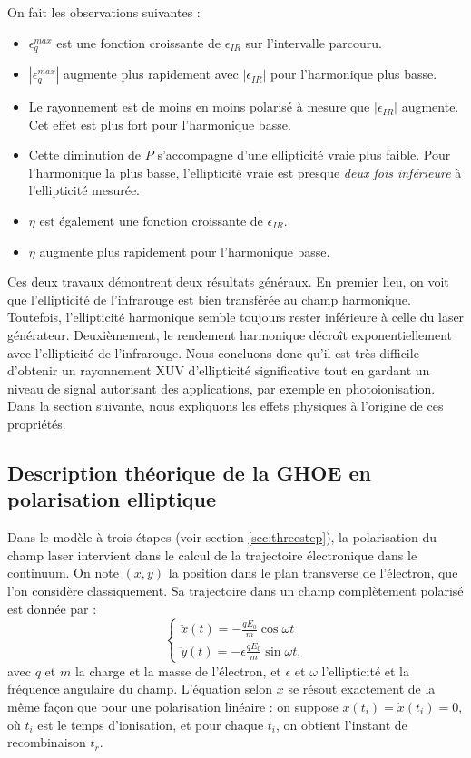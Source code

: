 On fait les observations suivantes :
\begin{itemize}
\renewcommand{\labelitemi}{$\bullet$}
\setlength\itemsep{1em}
\item $\epsilon^{max}_q$ est une fonction croissante de $\epsilon_{IR}$ sur l'intervalle parcouru.
\item $|\epsilon^{max}_q|$ augmente plus rapidement avec $|\epsilon_{IR}|$ pour l'harmonique plus basse.
\item Le rayonnement est de moins en moins polarisé à mesure que $|\epsilon_{IR}|$ augmente. Cet effet est plus fort pour l'harmonique basse.
\item Cette diminution de $P$ s'accompagne d'une ellipticité vraie plus faible. Pour l'harmonique la plus basse, l'ellipticité vraie est presque \textit{deux fois inférieure} à l'ellipticité mesurée.
\item $\eta$ est également une fonction croissante de $\epsilon_{IR}$.
\item $\eta$ augmente plus rapidement pour l'harmonique basse.
\end{itemize}
\vspace{\baselineskip}
Ces deux travaux démontrent deux résultats généraux. En premier lieu, on voit que l'ellipticité de l'infrarouge est bien transférée au champ harmonique. Toutefois, l'ellipticité harmonique semble toujours rester inférieure à celle du laser générateur. Deuxièmement, le rendement harmonique décroît exponentiellement avec l'ellipticité de l'infrarouge. Nous concluons donc qu'il est très difficile d'obtenir un rayonnement XUV d'ellipticité significative tout en gardant un niveau de signal autorisant des applications, par exemple en photoionisation. Dans la section suivante, nous expliquons les effets physiques à l'origine de ces propriétés.

\subsection{Description théorique de la GHOE en polarisation elliptique}
Dans le modèle à trois étapes (voir section \ref{sec:threestep}), la polarisation du champ laser intervient dans le calcul de la trajectoire électronique dans le continuum. On note $(x,y)$ la position dans le plan transverse de l'électron, que l'on considère classiquement. Sa trajectoire dans un champ complètement polarisé est donnée par :
\begin{equation}
\left\{
\begin{array}{l}
  \ddot{x}(t) = -\frac{qE_0}{m}\cos\omega t \\
  \ddot{y}(t) = -\epsilon\frac{qE_0}{m}\sin\omega t,
\end{array}
\right.
\end{equation}
avec $q$ et $m$ la charge et la masse de l'électron, et $\epsilon$ et $\omega$ l'ellipticité et la fréquence angulaire du champ. L'équation selon $x$ se résout exactement de la même façon que pour une polarisation linéaire : on suppose $x(t_i) = \dot{x}(t_i) = 0$, où $t_i$ est le temps d'ionisation, et pour chaque $t_i$, on obtient l'instant de recombinaison $t_r$.

